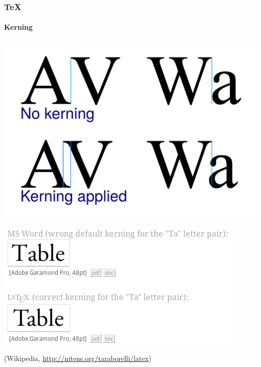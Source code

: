 \begin{frame}
\frametitle{\TeX{}}
\framesubtitle{Kerning}
\includegraphics[width=0.3\linewidth]{figures/kerning.pdf}

\vspace{2ex}
\includegraphics[width=0.4\linewidth]{figures/table_kerning.png}

\footnotesize{(Wikipedia, \url{http://nitens.org/taraborelli/latex})}
\end{frame}


